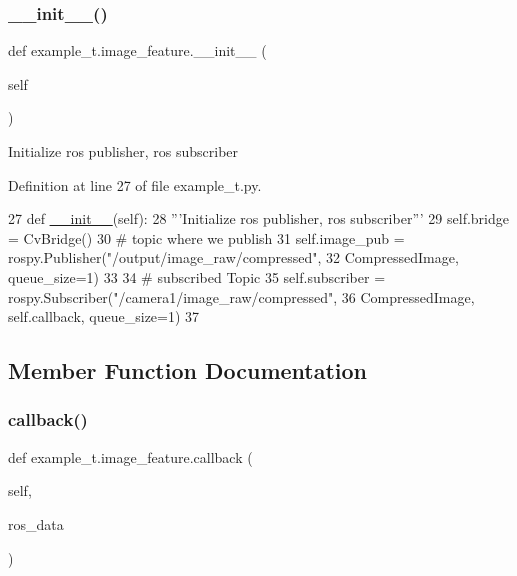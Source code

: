 \subsubsection{\texorpdfstring{\+\_\+\+\_\+init\+\_\+\+\_\+()}{\_\_init\_\_()}\hspace{0.1cm}{\footnotesize\ttfamily [2/2]}}
{\footnotesize\ttfamily def example\+\_\+t.\+image\+\_\+feature.\+\_\+\+\_\+init\+\_\+\+\_\+ (\begin{DoxyParamCaption}\item[{}]{self }\end{DoxyParamCaption})}

\begin{DoxyVerb}Initialize ros publisher, ros subscriber\end{DoxyVerb}
 

Definition at line 27 of file example\+\_\+t.\+py.


\begin{DoxyCode}
27     \textcolor{keyword}{def }\hyperlink{classstate__machine_1_1Play_a5993a23d8be7f7b2647f71ede0334957}{\_\_init\_\_}(self):
28         \textcolor{stringliteral}{'''Initialize ros publisher, ros subscriber'''}
29         self.bridge = CvBridge()
30         \textcolor{comment}{# topic where we publish}
31         self.image\_pub = rospy.Publisher(\textcolor{stringliteral}{"/output/image\_raw/compressed"},
32                                          CompressedImage, queue\_size=1)
33 
34         \textcolor{comment}{# subscribed Topic}
35         self.subscriber = rospy.Subscriber(\textcolor{stringliteral}{"/camera1/image\_raw/compressed"},
36                                            CompressedImage, self.callback,  queue\_size=1)
37 
\end{DoxyCode}


\subsection{Member Function Documentation}
\mbox{\label{classexample__t_1_1image__feature_a60a162ed0cac939db1c2bccd3d884ca6}} 
\subsubsection{\texorpdfstring{callback()}{callback()}\hspace{0.1cm}{\footnotesize\ttfamily [1/2]}}
{\footnotesize\ttfamily def example\+\_\+t.\+image\+\_\+feature.\+callback (\begin{DoxyParamCaption}\item[{}]{self,  }\item[{}]{ros\+\_\+data }\end{DoxyParamCaption})}

